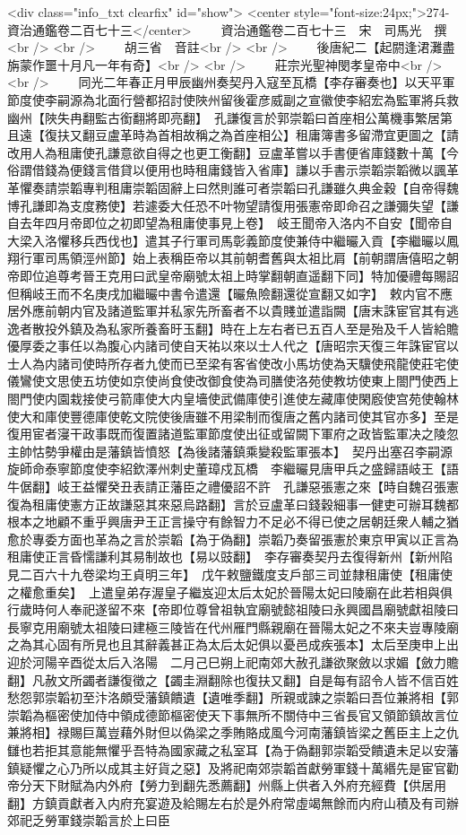 <div class="info_txt clearfix" id="show">
<center style="font-size:24px;">274-資治通鑑卷二百七十三</center>
  　　資治通鑑卷二百七十三　宋　司馬光　撰<br />
<br />
　　胡三省　音註<br />
<br />
　　後唐紀二【起閼逢涒灘盡旃蒙作噩十月凡一年有奇】<br />
<br />
　　莊宗光聖神閔孝皇帝中<br />
<br />
　　同光二年春正月甲辰幽州奏契丹入寇至瓦橋【李存審奏也】以天平軍節度使李嗣源為北面行營都招討使陜州留後霍彦威副之宣徽使李紹宏為監軍將兵救幽州【陜失冉翻監古銜翻將即亮翻】　孔謙復言於郭崇韜曰首座相公萬機事繁居第且遠【復扶又翻豆盧革時為首相故稱之為首座相公】租庸簿書多留滯宜更圖之【請改用人為租庸使孔謙意欲自得之也更工衡翻】豆盧革嘗以手書便省庫錢數十萬【今俗謂借錢為便錢言借貸以便用也時租庸錢皆入省庫】謙以手書示崇韜崇韜微以諷革革懼奏請崇韜專判租庸崇韜固辭上曰然則誰可者崇韜曰孔謙雖久典金穀【自帝得魏博孔謙即為支度務使】若遽委大任恐不叶物望請復用張憲帝即命召之謙彌失望【謙自去年四月帝即位之初即望為租庸使事見上卷】　岐王聞帝入洛内不自安【聞帝自大梁入洛懼移兵西伐也】遣其子行軍司馬彰義節度使兼侍中繼曮入貢【李繼曮以鳳翔行軍司馬領涇州節】始上表稱臣帝以其前朝耆舊與太祖比肩【前朝謂唐僖昭之朝帝即位追尊考晉王克用曰武皇帝廟號太祖上時掌翻朝直遥翻下同】特加優禮每賜詔但稱岐王而不名庚戌加繼曮中書令遣還【曮魚險翻還從宣翻又如字】　敕内官不應居外應前朝内官及諸道監軍并私家先所畜者不以貴賤並遣詣闕【唐末誅宦官其有逃逸者散投外鎮及為私家所養畜旴玉翻】時在上左右者已五百人至是殆及千人皆給贍優厚委之事任以為腹心内諸司使自天祐以來以士人代之【唐昭宗天復三年誅宦官以士人為内諸司使時所存者九使而已至梁有客省使改小馬坊使為天驥使飛龍使莊宅使儀鸞使文思使五坊使如京使尚食使改御食使為司膳使洛苑使教坊使東上閤門使西上閤門使内園栽接使弓箭庫使大内皇墻使武備庫使引進使左藏庫使閑廏使宫苑使翰林使大和庫使豐德庫使乾文院使後唐雖不用梁制而復唐之舊内諸司使其官亦多】至是復用宦者寖干政事既而復置諸道監軍節度使出征或留闕下軍府之政皆監軍决之陵忽主帥怙勢爭權由是藩鎮皆憤怒【為後諸藩鎮乘變殺監軍張本】　契丹出塞召李嗣源旋師命泰寧節度使李紹欽澤州刺史董璋戍瓦橋　李繼曮見唐甲兵之盛歸語岐王【語牛倨翻】岐王益懼癸丑表請正藩臣之禮優詔不許　孔謙惡張憲之來【時自魏召張憲復為租庸使憲方正故謙惡其來惡烏路翻】言於豆盧革曰錢穀細事一健吏可辦耳魏都根本之地顧不重乎興唐尹王正言操守有餘智力不足必不得已使之居朝廷衆人輔之猶愈於專委方面也革為之言於崇韜【為于偽翻】崇韜乃奏留張憲於東京甲寅以正言為租庸使正言昏懦謙利其易制故也【易以豉翻】　李存審奏契丹去復得新州【新州陷見二百六十九卷梁均王貞明三年】　戊午敕鹽鐵度支戶部三司並隸租庸使【租庸使之權愈重矣】　上遣皇弟存渥皇子繼岌迎太后太妃於晉陽太妃曰陵廟在此若相與俱行歲時何人奉祀遂留不來【帝即位尊曾祖執宜廟號懿祖陵曰永興國昌廟號獻祖陵曰長寧克用廟號太祖陵曰建極三陵皆在代州雁門縣親廟在晉陽太妃之不來夫豈專陵廟之為其心固有所見也且其辭義甚正為太后太妃俱以憂邑成疾張本】太后至庚申上出迎於河陽辛酉從太后入洛陽　二月己巳朔上祀南郊大赦孔謙欲聚斂以求媚【斂力贍翻】凡赦文所蠲者謙復徵之【蠲圭淵翻除也復扶又翻】自是每有詔令人皆不信百姓愁怨郭崇韜初至汴洛頗受藩鎮饋遺【遺唯季翻】所親或諫之崇韜曰吾位兼將相【郭崇韜為樞密使加侍中領成德節樞密使天下事無所不關侍中三省長官又領節鎮故言位兼將相】禄賜巨萬豈藉外財但以偽梁之季賄賂成風今河南藩鎮皆梁之舊臣主上之仇讎也若拒其意能無懼乎吾特為國家藏之私室耳【為于偽翻郭崇韜受饋遺未足以安藩鎮疑懼之心乃所以成其主好貨之惡】及將祀南郊崇韜首獻勞軍錢十萬緡先是宦官勸帝分天下財賦為内外府【勞力到翻先悉薦翻】州縣上供者入外府充經費【供居用翻】方鎮貢獻者入内府充宴遊及給賜左右於是外府常虛竭無餘而内府山積及有司辦郊祀乏勞軍錢崇韜言於上曰臣